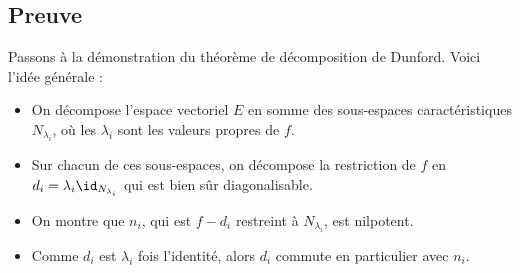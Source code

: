 \documentclass[12pt, class=report,crop=false]{standalone}
\begin{document}
\subsection{Preuve}

Passons à la démonstration du théorème de décomposition de Dunford. Voici l'idée générale :
\begin{itemize}
  \item On décompose l'espace vectoriel $E$ en somme des sous-espaces caractéristiques
$N_{\lambda_i}$, où les $\lambda_i$ sont les valeurs propres de $f$. 
  \item Sur chacun de ces sous-espaces, on décompose la restriction de $f$ en $d_i = \lambda_i \id_{N_{\lambda_i}}$ qui est bien sûr diagonalisable.
  \item On montre que $n_i$, qui est $f-d_i$ restreint à $N_{\lambda_i}$, est nilpotent.
  \item Comme $d_i$ est $\lambda_i$ fois l'identité, alors $d_i$ commute en particulier 
  avec $n_i$.
\end{itemize}
\end{document}
